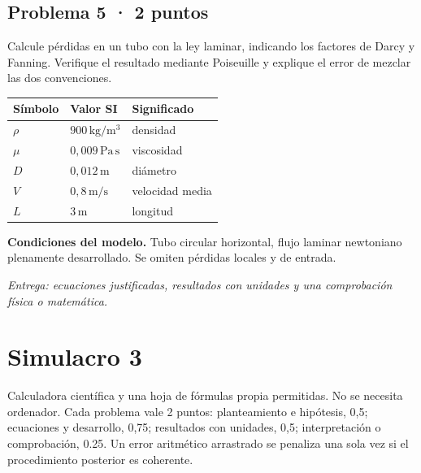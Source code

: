 \par\medskip\noindent\begin{minipage}{\linewidth}

\section{Problema 5 · 2 puntos}

Calcule pérdidas en un tubo con la ley laminar, indicando los factores de Darcy y Fanning. Verifique el resultado mediante Poiseuille y explique el error de mezclar las dos convenciones.

\begin{tabular}{@{}p{.15\linewidth}p{.23\linewidth}p{.54\linewidth}@{}}
\toprule Símbolo & Valor SI & Significado\\\midrule
$\rho$ & $900\,\mathrm{kg/m^3}$ & densidad\\
$\mu$ & $0{,}009\,\mathrm{Pa\,s}$ & viscosidad\\
$D$ & $0{,}012\,\mathrm{m}$ & diámetro\\
$V$ & $0{,}8\,\mathrm{m/s}$ & velocidad media\\
$L$ & $3\,\mathrm{m}$ & longitud\\
\bottomrule\end{tabular}

\par\medskip\textbf{Condiciones del modelo.} Tubo circular horizontal, flujo laminar newtoniano plenamente desarrollado. Se omiten pérdidas locales y de entrada.

\par\textit{Entrega: ecuaciones justificadas, resultados con unidades y una comprobación física o matemática.}

\end{minipage}\par\medskip


\chapter{Simulacro 3}


Calculadora científica y una hoja de fórmulas propia permitidas. No se necesita ordenador. Cada problema vale 2 puntos: planteamiento e hipótesis, 0,5; ecuaciones y desarrollo, 0,75; resultados con unidades, 0,5; interpretación o comprobación, 0.25. Un error aritmético arrastrado se penaliza una sola vez si el procedimiento posterior es coherente.


